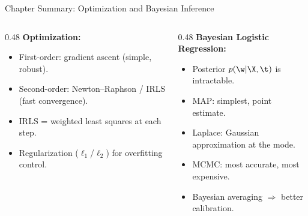 \begin{frame}{Chapter Summary: Optimization and Bayesian Inference}
  \begin{columns}[T]
    \begin{column}{0.48\textwidth}
      \textbf{Optimization:}
      \begin{itemize}
        \item First-order: gradient ascent (simple, robust).
        \item Second-order: Newton--Raphson / IRLS (fast convergence).
        \item IRLS = weighted least squares at each step.
        \item Regularization ($\ell_1$/$\ell_2$) for overfitting control.
      \end{itemize}
    \end{column}
    \begin{column}{0.48\textwidth}
      \textbf{Bayesian Logistic Regression:}
      \begin{itemize}
        \item Posterior $p(\w|\X,\t)$ is intractable.
        \item MAP: simplest, point estimate.
        \item Laplace: Gaussian approximation at the mode.
        \item MCMC: most accurate, most expensive.
        \item Bayesian averaging $\Rightarrow$ better calibration.
      \end{itemize}
    \end{column}
  \end{columns}
\end{frame}


%
